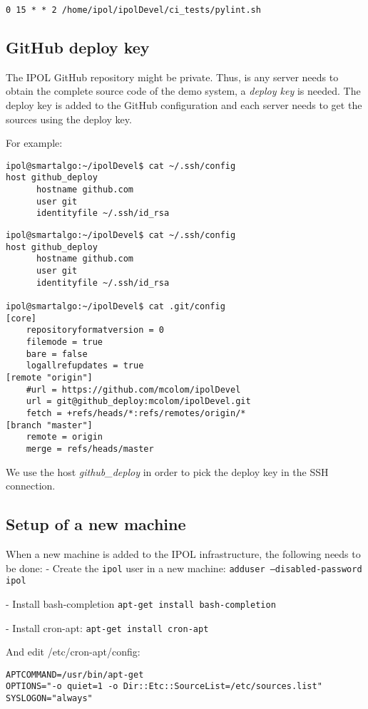 \documentclass[a4paper,12pt]{article}
\begin{document}
{\tt 0 15 * * 2 /home/ipol/ipolDevel/ci\_tests/pylint.sh}



\subsection{GitHub deploy key}
The IPOL GitHub repository might be private. Thus, is any server needs to obtain the complete source code of the demo system, a \emph{deploy key} is needed. The deploy key is added to the GitHub configuration and each server needs to get the sources using the deploy key.

For example:

\begin{verbatim}
ipol@smartalgo:~/ipolDevel$ cat ~/.ssh/config 
host github_deploy
      hostname github.com
      user git
      identityfile ~/.ssh/id_rsa
\end{verbatim}

\vspace{0.15cm}

\begin{verbatim}
ipol@smartalgo:~/ipolDevel$ cat ~/.ssh/config 
host github_deploy
      hostname github.com
      user git
      identityfile ~/.ssh/id_rsa

ipol@smartalgo:~/ipolDevel$ cat .git/config 
[core]
	repositoryformatversion = 0
	filemode = true
	bare = false
	logallrefupdates = true
[remote "origin"]
	#url = https://github.com/mcolom/ipolDevel
	url = git@github_deploy:mcolom/ipolDevel.git
	fetch = +refs/heads/*:refs/remotes/origin/*
[branch "master"]
	remote = origin
	merge = refs/heads/master
\end{verbatim}

We use the host \emph{github\_deploy} in order to pick the deploy key in the SSH connection.

\subsection{Setup of a new machine}
When a new machine is added to the IPOL infrastructure, the following needs to be done:
- Create the {\tt ipol} user in a new machine: {\tt adduser --disabled-password ipol}

- Install bash-completion {\tt apt-get install bash-completion}

- Install cron-apt: {\tt apt-get install cron-apt}

And edit /etc/cron-apt/config:
\begin{verbatim}
APTCOMMAND=/usr/bin/apt-get
OPTIONS="-o quiet=1 -o Dir::Etc::SourceList=/etc/sources.list"
SYSLOGON="always"
\end{verbatim}
\end{document}
